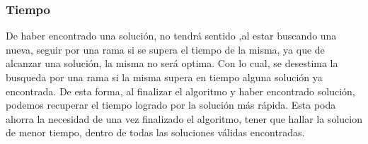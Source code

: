 \subsubsection*{Tiempo}
De haber encontrado una solución, no tendrá sentido ,al estar buscando una nueva, seguir por una rama si se supera el tiempo de la misma, ya que de alcanzar una solución, la misma no será optima. Con lo cual, se desestima la busqueda por una rama si la misma supera en tiempo alguna solución ya encontrada. De esta forma, al finalizar el algoritmo y haber encontrado solución, podemos recuperar el tiempo logrado por la solución más rápida. Esta poda ahorra la necesidad de una vez finalizado el algoritmo, tener que hallar la solucion de menor tiempo, dentro de todas las soluciones válidas encontradas.

